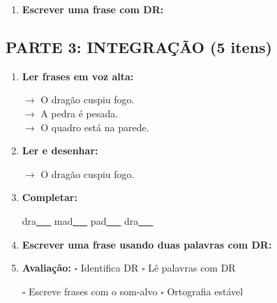 \begin{exercicio}
\begin{enumerate}[resume]
  \item \textbf{Escrever uma frase com DR:}
  \begin{center}
  \underline{\hspace{12cm}}
  \end{center}

\end{enumerate}

\subsection*{PARTE 3: INTEGRAÇÃO (5 itens)}

\begin{enumerate}[resume]

  \item \textbf{Ler frases em voz alta:}
  \begin{center}
  $\rightarrow$ O dragão cuspiu fogo.\\
  $\rightarrow$ A pedra é pesada.\\
  $\rightarrow$ O quadro está na parede.\\
  \end{center}

  \item \textbf{Ler e desenhar:}
  \begin{center}
  $\rightarrow$ O dragão cuspiu fogo.
  \end{center}
  \begin{center}
  \end{center}

  \item \textbf{Completar:}
  \begin{center}
  dra\underline{~~~} \quad mad\underline{~~~} \quad pad\underline{~~~} \quad dra\underline{~~~}
  \end{center}

  \item \textbf{Escrever uma frase usando duas palavras com DR:}
  \begin{center}
  \underline{\hspace{12cm}}
  \end{center}

  \item \textbf{Avaliação:} $\square$ Identifica DR \quad $\square$ Lê palavras com DR
  \begin{center}
  $\square$ Escreve frases com o som-alvo \quad $\square$ Ortografia estável
  \end{center}


\end{enumerate}
\end{exercicio}
